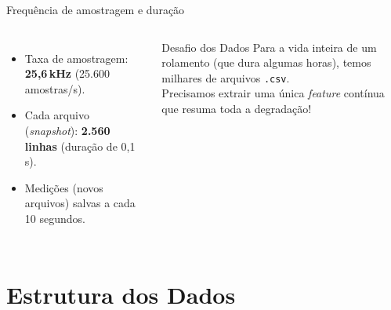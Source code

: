 \documentclass{beamer}
\begin{document}
\begin{frame}{Frequência de amostragem e duração}
    \begin{columns}
        \begin{itemize}
            \item Taxa de amostragem: \textbf{25,6\,kHz} (25.600 amostras/s).
            \item Cada arquivo (\textit{snapshot}): \textbf{2.560 linhas} (duração de 0,1\,s).
            \item Medições (novos arquivos) salvas a cada 10 segundos.
        \end{itemize}
        \begin{alertblock}{Desafio dos Dados}
            Para a vida inteira de um rolamento (que dura algumas horas), temos milhares de arquivos \texttt{.csv}.\\[4pt]
            Precisamos extrair uma única \textit{feature} contínua que resuma toda a degradação!
        \end{alertblock}
    \end{columns}
\end{frame}

\section{Estrutura dos Dados}
\end{document}
